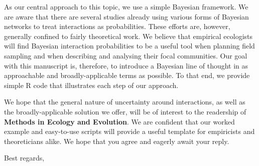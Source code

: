 \documentclass[12pt]{letter}
\begin{document}
\begin{letter}


    As our central approach to this topic, we use a simple Bayesian framework. We are aware that there are several studies already using various forms of Bayesian networks to treat interactions as probabilities. These efforts are, however, generally confined to fairly theoretical work. We believe that empirical ecologists will find Bayesian interaction probabilities to be a useful tool when planning field sampling and when describing and analysing their focal communities. Our goal with this manuscript is, therefore, to introduce a Bayesian line of thought in as approachable and broadly-applicable terms as possible. To that end, we provide simple R code that illustrates each step of our approach. 


    We hope that the general nature of uncertainty around interactions, as well as the broadly-applicable solution we offer, will be of interest to the readership of \textbf{Methods in Ecology and Evolution}. We are confident that our worked example and easy-to-use scripts will provide a useful template for empiricists and theoreticians alike. We hope that you agree and eagerly await your reply.


\closing{Best regards,}


\end{letter}
\end{document}
